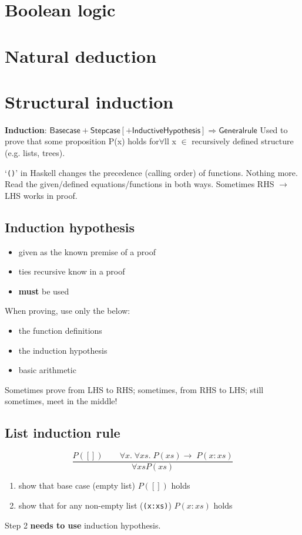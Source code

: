 \documentclass[10pt,a4paper,landscape]{article}
\begin{document}
\pagestyle{empty}

\begin{multicols*}{3}
\section{Boolean logic}

\section{Natural deduction}

\section{Structural induction}
\textbf{Induction}: \(\mathsf{Base case} + \mathsf{Step case} [+ \mathsf{Inductive Hypothesis}] \Rightarrow \mathsf{General rule}\)
Used to prove that some proposition P(x) holds for$\forall$ll x $\in$ recursively defined structure (e.g. lists, trees).

`\verb|()|' in Haskell changes the precedence (calling order) of functions. Nothing more.
Read the given/defined equations/functions in both ways. Sometimes RHS \(\rightarrow\) LHS works in proof.
\subsection*{Induction hypothesis}
\begin{itemize}
\item given as the known premise of a proof
\item ties recursive know in a proof
\item \textbf{must} be used
\end{itemize}
When proving, use only the below:
\begin{itemize}
\item the function definitions
\item the induction hypothesis
\item basic arithmetic
\end{itemize}
Sometimes prove from LHS to RHS; sometimes, from RHS to LHS; still sometimes, meet in the middle!
\subsection*{List induction rule}
\begin{displaymath}
\frac{P([])\qquad \forall x.\; \forall xs.\; P(xs) \rightarrow\; P(x:xs)}{\forall xs P(xs)}
\end{displaymath}
\begin{enumerate}
\item show that base case (empty list) $P([])$ holds
\item show that for any non-empty list (\verb|(x:xs)|) $P(x:xs)$ holds
\end{enumerate}
Step 2 \textbf{needs to use} induction hypothesis.


\end{multicols*}
\end{document}

